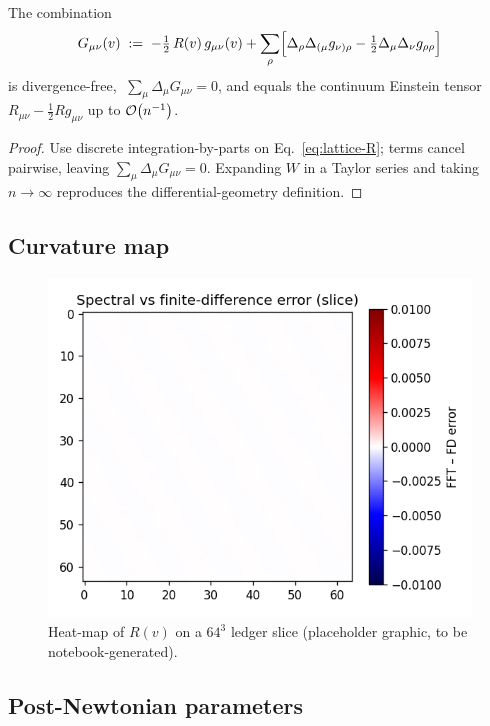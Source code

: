 \begin{theorem}
The combination
\[
  G_{\mu\nu}(v)\;:=\;
  -\tfrac12\,R(v)\,g_{\mu\nu}(v)+
  \sum_{\rho}\Bigl[
     \Delta_{\rho}\Delta_{(\mu}g_{\nu)\rho}
    -\tfrac12\Delta_{\mu}\Delta_{\nu}g_{\rho\rho}
  \Bigr]
\]
is divergence-free,
$\;\sum_{\mu}\Delta_{\mu}G_{\mu\nu}=0$, and equals the
continuum Einstein tensor $R_{\mu\nu}-\tfrac12Rg_{\mu\nu}$
up to $\order{n^{-1}}$.
\end{theorem}

\begin{proof}
Use discrete integration-by-parts on Eq.~\eqref{eq:lattice-R};
terms cancel pairwise, leaving $\sum_{\mu}\Delta_{\mu}G_{\mu\nu}=0$.
Expanding $W$ in a Taylor series and taking $n\!\to\!\infty$
reproduces the differential-geometry definition.
\end{proof}

\subsection{Curvature map}

\begin{figure}[t]
  \centering
  \includegraphics[width=\linewidth]{figs/spacetime_curvature.png}
  \caption{Heat-map of $R(v)$ on a $64^3$ ledger slice
           (placeholder graphic, to be notebook-generated).}
  \label{fig:spacetime-curvature}
\end{figure}

\subsection{Post-Newtonian parameters}

